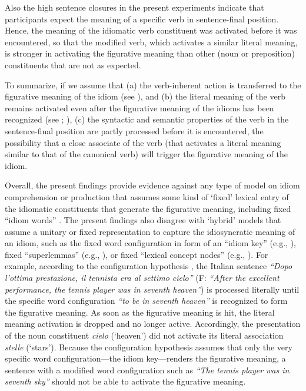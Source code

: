 Also the high sentence closures in the present experiments indicate that participants expect the meaning of a specific verb in sentence-final position. Hence, the meaning of the idiomatic verb constituent was activated before it was encountered, so that the modified verb, which activates a similar literal meaning, is stronger in activating the figurative meaning than other (noun or preposition) constituents that are not as expected. 


To summarize, if we assume that (a) the verb-inherent action is transferred to the figurative meaning of the idiom (see \citealt{hamblin:1999}), and (b) the literal meaning of the verb remains activated even after the figurative meaning of the idioms has been recognized (see \citealt{rabanus:2008}; \citealt{smolka:2007}), (c) the syntactic and semantic properties of the verb in the sentence-final position are partly processed before it is encountered, the possibility that a close associate of the verb (that activates a literal meaning similar to that of the canonical verb) will trigger the figurative meaning of the idiom.  


Overall, the present findings provide evidence against any type of model on idiom comprehension or production that assumes some kind of ‘fixed’ lexical entry of the idiomatic constituents that generate the figurative meaning, including fixed ``idiom words'' \citep{bobrow:1973}. The present findings also disagree with ‘hybrid’ models that assume a unitary or fixed representation to capture the idiosyncratic meaning of an idiom, such as the fixed word configuration in form of an ``idiom key'' (e.g., \citealt{cacciari:1988}), fixed ``superlemmas'' (e.g., \citealt{sprenger:2006}), or fixed ``lexical concept nodes'' (e.g., \citealt{cutting:1997}). For example, according to the configuration hypothesis \citep{cacciari:1988}, the Italian sentence \textit{``Dopo l’ottima prestazione, il tennista era al settimo cielo''} (F: \textit{``After the excellent performance, the tennis player was in seventh heaven''}) is processed literally until the specific word configuration \textit{``to be in seventh heaven''} is recognized to form the figurative meaning. As soon as the figurative meaning is hit, the literal meaning activation is dropped and no longer active. Accordingly, the presentation of the noun constituent \textit{cielo} (‘heaven’) did not activate its literal association \textit{stelle} (‘stars’). Because the configuration hypothesis assumes that only the very specific word configuration—the idiom key—renders the figurative meaning, a sentence with a modified word configuration such as \textit{``The tennis player was in seventh sky''} should not be able to activate the figurative meaning. 


